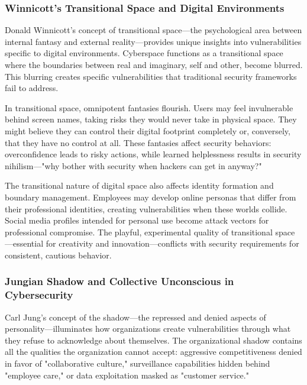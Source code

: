 \documentclass[manuscript,screen,review]{acmart}
\begin{document}
\subsubsection{Winnicott's Transitional Space and Digital Environments}

Donald Winnicott's concept of transitional space\cite{winnicott1971}—the psychological area between internal fantasy and external reality—provides unique insights into vulnerabilities specific to digital environments. Cyberspace functions as a transitional space where the boundaries between real and imaginary, self and other, become blurred. This blurring creates specific vulnerabilities that traditional security frameworks fail to address.

In transitional space, omnipotent fantasies flourish. Users may feel invulnerable behind screen names, taking risks they would never take in physical space. They might believe they can control their digital footprint completely or, conversely, that they have no control at all. These fantasies affect security behaviors: overconfidence leads to risky actions, while learned helplessness results in security nihilism—"why bother with security when hackers can get in anyway?"

The transitional nature of digital space also affects identity formation and boundary management. Employees may develop online personas that differ from their professional identities, creating vulnerabilities when these worlds collide. Social media profiles intended for personal use become attack vectors for professional compromise. The playful, experimental quality of transitional space—essential for creativity and innovation—conflicts with security requirements for consistent, cautious behavior.

\subsubsection{Jungian Shadow and Collective Unconscious in Cybersecurity}

Carl Jung's concept of the shadow\cite{jung1969}—the repressed and denied aspects of personality—illuminates how organizations create vulnerabilities through what they refuse to acknowledge about themselves. The organizational shadow contains all the qualities the organization cannot accept: aggressive competitiveness denied in favor of "collaborative culture," surveillance capabilities hidden behind "employee care," or data exploitation masked as "customer service."
\end{document}
